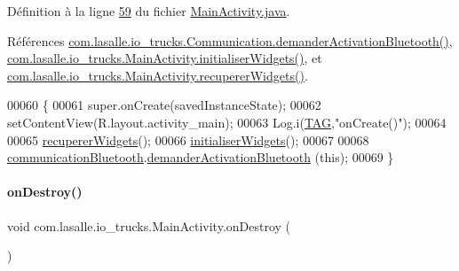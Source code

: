 Définition à la ligne \hyperlink{_main_activity_8java_source_l00059}{59} du fichier \hyperlink{_main_activity_8java_source}{Main\+Activity.\+java}.



Références \hyperlink{_communication_8java_source_l00043}{com.\+lasalle.\+io\+\_\+trucks.\+Communication.\+demander\+Activation\+Bluetooth()}, \hyperlink{_main_activity_8java_source_l00272}{com.\+lasalle.\+io\+\_\+trucks.\+Main\+Activity.\+initialiser\+Widgets()}, et \hyperlink{_main_activity_8java_source_l00257}{com.\+lasalle.\+io\+\_\+trucks.\+Main\+Activity.\+recuperer\+Widgets()}.


\begin{DoxyCode}
00060     \{
00061         super.onCreate(savedInstanceState);
00062         setContentView(R.layout.activity\_main);
00063         Log.i(\hyperlink{classcom_1_1lasalle_1_1io__trucks_1_1_main_activity_a37b90dba972711328e3f4c83c55eb0fc}{TAG},\textcolor{stringliteral}{"onCreate()"});
00064 
00065         \hyperlink{classcom_1_1lasalle_1_1io__trucks_1_1_main_activity_a36109f04e626f0bf4c1a73da14c4fb2b}{recupererWidgets}();
00066         \hyperlink{classcom_1_1lasalle_1_1io__trucks_1_1_main_activity_a6c15e67f7d99f62d1e40de710216a1d7}{initialiserWidgets}();
00067 
00068         \hyperlink{classcom_1_1lasalle_1_1io__trucks_1_1_main_activity_aef1818afc9c0d071330ccc244e4b3794}{communicationBluetooth}.\hyperlink{classcom_1_1lasalle_1_1io__trucks_1_1_communication_aba4889871694f97fb1897f9a5b0979f4}{demanderActivationBluetooth}
      (\textcolor{keyword}{this});
00069     \}
\end{DoxyCode}
\mbox{\label{classcom_1_1lasalle_1_1io__trucks_1_1_main_activity_a41e9b1eab2362456217786165b87d25e}} 
\paragraph{\texorpdfstring{on\+Destroy()}{onDestroy()}}
{\footnotesize\ttfamily void com.\+lasalle.\+io\+\_\+trucks.\+Main\+Activity.\+on\+Destroy (\begin{DoxyParamCaption}{ }\end{DoxyParamCaption})\hspace{0.3cm}{\ttfamily [protected]}}



